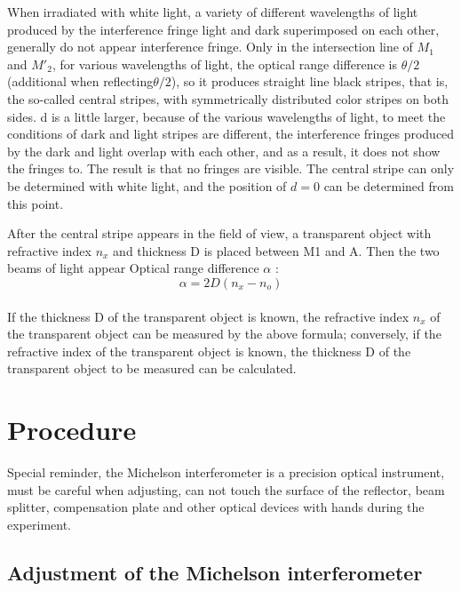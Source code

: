 \documentclass[UTF8]{article}
\begin{document}
When irradiated with white light, a variety of different wavelengths of light produced by the interference fringe light and dark superimposed on each other, generally do not appear interference fringe. Only in the intersection line of $M_1$ and $M'_2$, for various wavelengths of light, the optical range difference is $\theta /2$(additional when reflecting$\theta /2$), so it produces straight line black stripes, that is, the so-called central stripes, with symmetrically distributed color stripes on both sides. d is a little larger, because of the various wavelengths of light, to meet the conditions of dark and light stripes are different, the interference fringes produced by the dark and light overlap with each other, and as a result, it does not show the fringes to. The result is that no fringes are visible. The central stripe can only be determined with white light, and the position of $d=0$ can be determined from this point.

 After the central stripe appears in the field of view, a transparent object with refractive index $n_x$ and thickness D is placed between M1 and A. Then the two beams of light appear Optical range difference $\alpha$ :\\
 
 \[\alpha =2D(n_{x}-n_{o} )\]\\

 If the thickness D of the transparent object is known, the refractive index $n_x$ of the transparent object can be measured by the above formula; conversely, if the refractive index of the transparent object is known, the thickness D of the transparent object to be measured can be calculated.

 
 \section{Procedure}
 Special reminder, the Michelson interferometer is a precision optical instrument, must be careful when adjusting, can not touch the surface of the reflector, beam splitter, compensation plate and other optical devices with hands during the experiment.
	\subsection{Adjustment of the Michelson interferometer}
\end{document}
